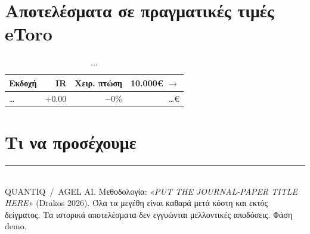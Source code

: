 \documentclass[11pt]{article}
\newcommand{\eur}{€}                     %
\newcommand{\papertitle}{\emph{«PUT THE JOURNAL-PAPER TITLE HERE»} (Drakos 2026)}
\begin{document}
\section{Αποτελέσματα σε πραγματικές τιμές eToro}
\begin{table}[ht]\centering\small
\begin{tabular}{lrrr}\toprule
Εκδοχή & IR & Χειρ. πτώση & 10.000\eur{} $\to$ \\\midrule
\dots & \textcolor{good}{$+0.00$} & \textcolor{warn}{$-0\%$} & \dots\eur{} \\
\bottomrule\end{tabular}
\caption{...}
\end{table}


\section{Τι να προσέχουμε}

\vfill
\noindent\rule{\linewidth}{0.4pt}\\[2pt]
{\small QUANTIQ \,/\, AGEL AI. Μεθοδολογία: \papertitle. Όλα τα μεγέθη είναι καθαρά μετά κόστη και
εκτός δείγματος. Τα ιστορικά αποτελέσματα δεν εγγυώνται μελλοντικές αποδόσεις. Φάση demo.}
\end{document}
